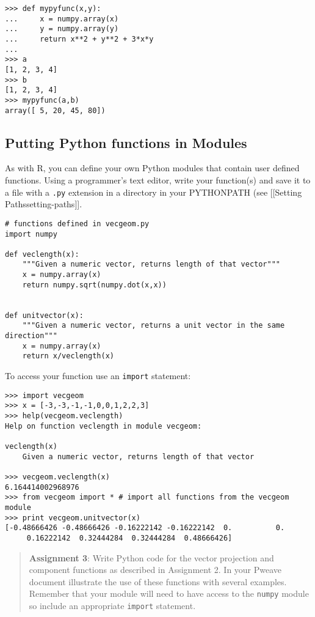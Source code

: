 \begin{lstlisting}
>>> def mypyfunc(x,y):
...     x = numpy.array(x)
...     y = numpy.array(y)
...     return x**2 + y**2 + 3*x*y
... 
>>> a
[1, 2, 3, 4]
>>> b
[1, 2, 3, 4]
>>> mypyfunc(a,b)
array([ 5, 20, 45, 80])
\end{lstlisting}

\subsection{Putting Python functions in Modules}

As with R, you can define your own Python modules that contain user
defined functions. Using a programmer's text editor, write your
function(s) and save it to a file with a \lstinline!.py! extension in a
directory in your PYTHONPATH (see {[}{[}Setting
Paths\textbar{}setting-paths{]}{]}.

\begin{lstlisting}
# functions defined in vecgeom.py
import numpy

def veclength(x):
    """Given a numeric vector, returns length of that vector""" 
    x = numpy.array(x)
    return numpy.sqrt(numpy.dot(x,x))


def unitvector(x):
    """Given a numeric vector, returns a unit vector in the same direction"""
    x = numpy.array(x)
    return x/veclength(x)
\end{lstlisting}
To access your function use an \lstinline!import! statement:

\begin{lstlisting}
>>> import vecgeom
>>> x = [-3,-3,-1,-1,0,0,1,2,2,3]
>>> help(vecgeom.veclength)
Help on function veclength in module vecgeom:

veclength(x)
    Given a numeric vector, returns length of that vector

>>> vecgeom.veclength(x)
6.164414002968976
>>> from vecgeom import * # import all functions from the vecgeom module
>>> print vecgeom.unitvector(x)
[-0.48666426 -0.48666426 -0.16222142 -0.16222142  0.          0.   
     0.16222142  0.32444284  0.32444284  0.48666426]
\end{lstlisting}
\begin{quote}
\textbf{Assignment 3}: Write Python code for the vector projection and
component functions as described in Assignment 2. In your Pweave
document illustrate the use of these functions with several examples.
Remember that your module will need to have access to the
\lstinline!numpy! module so include an appropriate \lstinline!import!
statement.

\end{quote}

